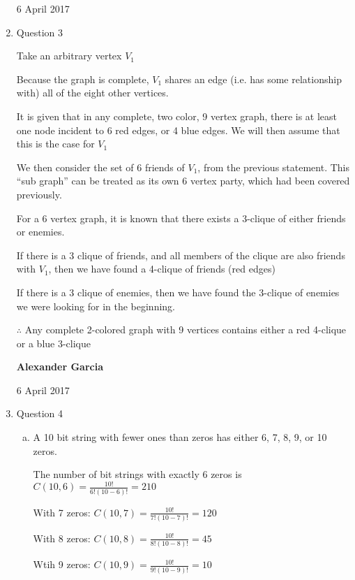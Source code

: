 \documentclass[11pt]{article}
\begin{document}
\begin{enumerate}
		6 April 2017 \\

	\item Question 3

		Take an arbitrary vertex $V_1$

		Because the graph is complete, $V_1$ shares an edge (i.e. has some
		relationship with) all of the eight other vertices.

		It is given that in any complete, two color, 9 vertex graph, there is
		at least one node incident to 6 red edges, or 4 blue edges. We will
		then assume that this is the case for $V_1$

		We then consider the set of 6 friends of $V_1$, from the previous
		statement. This ``sub graph'' can be treated as its own 6 vertex
		party, which had been covered previously.

		For a 6 vertex graph, it is known that there exists a 3-clique of either
		friends or enemies.

		If there is a 3 clique of friends, and all members of the clique are also
		friends with $V_1$, then we have found a 4-clique of friends (red edges)

		If there is a 3 clique of enemies, then we have found the 3-clique of enemies
		we were looking for in the beginning.

		$\therefore$ Any complete 2-colored graph with 9 vertices contains either a
		red 4-clique or a blue 3-clique \\

		\newpage

		\textbf{Alexander Garcia}

		6 April 2017 \\

	\item Question 4

		\begin{enumerate}[(a)]

			\item A 10 bit string with fewer ones than zeros has either
				6, 7, 8, 9, or 10 zeros.

				The number of bit strings with exactly 6 zeros is
				$C(10, 6) = \frac{10!}{6!(10-6)!}=210$

				With 7 zeros:
				$C(10, 7) = \frac{10!}{7!(10-7)!}=120$

				With 8 zeros:
				$C(10, 8) = \frac{10!}{8!(10-8)!}=45$

				Wtih 9 zeros:
				$C(10, 9) = \frac{10!}{9!(10-9)!}=10$


\end{enumerate}
\end{enumerate}
\end{document}
